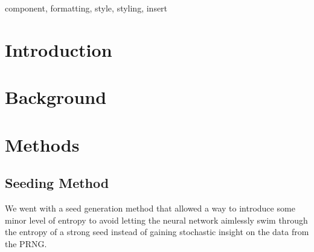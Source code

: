 \documentclass[conference]{IEEEtran}
\begin{document}

\begin{abstract}
This document is a model and instructions for \LaTeX.
This and the IEEEtran.cls file define the components of your paper [title, text, heads, etc.]. *CRITICAL: Do Not Use Symbols, Special Characters, Footnotes, 
or Math in Paper Title or Abstract.
This document is a model and instructions for \LaTeX.
This and the IEEEtran.cls file define the components of your paper [title, text, heads, etc.]. *CRITICAL: Do Not Use Symbols, Special Characters, Footnotes, 
or Math in Paper Title or Abstract.
This document is a model and instructions for \LaTeX.
This and the IEEEtran.cls file define the components of your paper [title, text, heads, etc.]. *CRITICAL: Do Not Use Symbols, Special Characters, Footnotes, 
or Math in Paper Title or Abstract.
This document is a model and instructions for \LaTeX.
This and the IEEEtran.cls file define the components of your paper [title, text, heads, etc.]. *CRITICAL: Do Not Use Symbols, Special Characters, Footnotes, 
or Math in Paper Title or Abstract.

\end{abstract}



\begin{IEEEkeywords}
component, formatting, style, styling, insert
\end{IEEEkeywords}

\section{Introduction}


\section{Background}


\section{Methods}
\subsection{Seeding Method}
We went with a seed generation method that allowed a way to introduce some minor level of entropy to avoid letting the neural network aimlessly swim through the entropy of a strong seed instead of gaining stochastic insight on the data from the PRNG.
\end{document}
